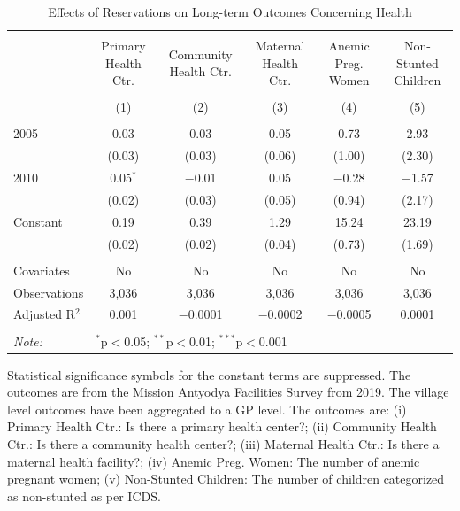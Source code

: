 \begin{table}
\centering
\begin{threeparttable}

  \caption{Effects of Reservations on Long-term Outcomes Concerning Health} 
  \label{raj_shrug_health_05_10} 
\scriptsize 
\begin{tabular}{@{\extracolsep{0pt}}lccccc} 
\\[-1.8ex]\hline 
\hline \\[-1.8ex] 
 & Primary Health Ctr. & Community Health Ctr. & Maternal Health Ctr. & Anemic Preg. Women & Non-Stunted Children \\ 
\\[-1.8ex] & (1) & (2) & (3) & (4) & (5)\\ 
\hline \\[-1.8ex] 
 2005 & 0.03 & 0.03 & 0.05 & 0.73 & 2.93 \\ 
  & (0.03) & (0.03) & (0.06) & (1.00) & (2.30) \\ 
  2010 & 0.05$^{*}$ & $-$0.01 & 0.05 & $-$0.28 & $-$1.57 \\ 
  & (0.02) & (0.03) & (0.05) & (0.94) & (2.17) \\ 
  Constant & 0.19 & 0.39 & 1.29 & 15.24 & 23.19 \\ 
  & (0.02) & (0.02) & (0.04) & (0.73) & (1.69) \\ 
 \hline \\[-1.8ex] 
Covariates & No & No & No & No & No \\ 
Observations & 3,036 & 3,036 & 3,036 & 3,036 & 3,036 \\ 
Adjusted R$^{2}$ & 0.001 & $-$0.0001 & $-$0.0002 & $-$0.0005 & 0.0001 \\ 
\hline 
\hline \\[-1.8ex] 
\textit{Note:}  & \multicolumn{5}{l}{$^{*}$p$<$0.05; $^{**}$p$<$0.01; $^{***}$p$<$0.001} \\ 
\end{tabular} 
\begin{tablenotes}[flushleft]
\setlength{\itemindent}{0em}
\scriptsize
\item[] Statistical significance symbols for the constant terms are suppressed. The outcomes are from the Mission Antyodya Facilities Survey from 2019. The village level outcomes have been aggregated to a GP level. The outcomes are:
                    (i) Primary Health Ctr.: Is there a primary health center?;
                    (ii) Community Health Ctr.: Is there a community health center?;
                    (iii) Maternal Health Ctr.: Is there a maternal health facility?;
                    (iv) Anemic Preg. Women: The number of anemic pregnant women;
                    (v) Non-Stunted Children: The number of children categorized as non-stunted as per ICDS.
\end{tablenotes}
\end{threeparttable}
\end{table}
